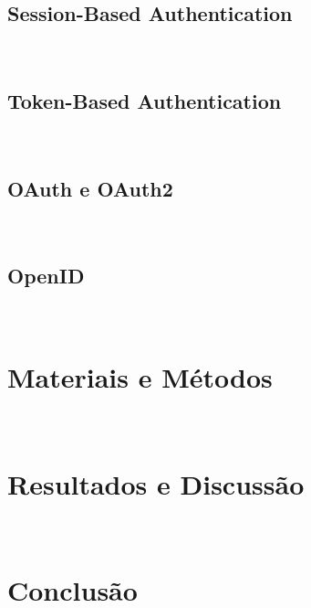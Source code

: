 \documentclass[12pt]{article}
\begin{document}
\

\subsection{Session-Based Authentication}
\
\subsection{Token-Based Authentication}
\
\subsection{OAuth e OAuth2}
\
\subsection{OpenID}
\
\section{Materiais e Métodos}
\
\section{Resultados e Discussão}
\
\section{Conclusão}
\


\end{document}
